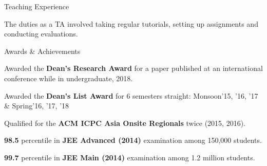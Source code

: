 \documentclass{resume} %
\begin{document}
\begin{rSection}{Teaching Experience}


The duties as a TA involved taking regular tutorials, setting up assignments and conducting evaluations.
\end{rSection}

\vspace{-5pt}
\begin{rSection}{Awards \& Achievements}
\begin{rSubsection}{\large \underline {} }{}{}{} \itemsep -1.5pt
\item Awarded the \textbf{Dean's Research Award} for a paper published at an international conference while in undergraduate, 2018.
\item Awarded the \textbf{Dean's List Award} for 6 semesters straight: Monsoon'15, '16, '17 \& Spring'16, '17, '18
\item Qualified for the \textbf{ACM ICPC Asia Onsite Regionals} twice (2015, 2016).
\item \textbf{98.5} percentile in \textbf{JEE Advanced (2014)} examination among 150,000 students.
\item \textbf{99.7} percentile in \textbf{JEE Main (2014)} examination among 1.2 million students.
\end{rSubsection}
\end{rSection}
\end{document}
